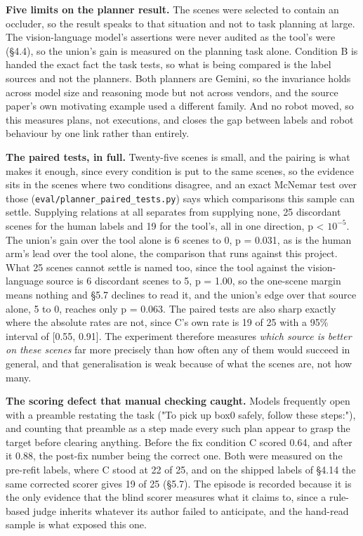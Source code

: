 \textbf{Five limits on the planner result.} The scenes were selected to contain an occluder, so the result speaks to that situation and not to task planning at large. The vision-language model's assertions were never audited as the tool's were (\S{}4.4), so the union's gain is measured on the planning task alone. Condition B is handed the exact fact the task tests, so what is being compared is the label sources and not the planners. Both planners are Gemini, so the invariance holds across model size and reasoning mode but not across vendors, and the source paper's own motivating example used a different family. And no robot moved, so this measures plans, not executions, and closes the gap between labels and robot behaviour by one link rather than entirely.

\textbf{The paired tests, in full.} Twenty-five scenes is small, and the pairing is what makes it enough, since every condition is put to the same scenes, so the evidence sits in the scenes where two conditions disagree, and an exact McNemar test over those (\texttt{eval/planner\_\allowbreak{}paired\_\allowbreak{}tests.py}) says which comparisons this sample can settle. Supplying relations at all separates from supplying none, 25 discordant scenes for the human labels and 19 for the tool's, all in one direction, p < $10^{-5}$. The union's gain over the tool alone is 6 scenes to 0, p = 0.031, as is the human arm's lead over the tool alone, the comparison that runs against this project. What 25 scenes cannot settle is named too, since the tool against the vision-language source is 6 discordant scenes to 5, p = 1.00, so the one-scene margin means nothing and \S{}5.7 declines to read it, and the union's edge over that source alone, 5 to 0, reaches only p = 0.063. The paired tests are also sharp exactly where the absolute rates are not, since C's own rate is 19 of 25 with a 95\% interval of [0.55, 0.91]. The experiment therefore measures \textit{which source is better on these scenes} far more precisely than how often any of them would succeed in general, and that generalisation is weak because of what the scenes are, not how many.

\textbf{The scoring defect that manual checking caught.} Models frequently open with a preamble restating the task ("To pick up box0 safely, follow these steps:"), and counting that preamble as a step made every such plan appear to grasp the target before clearing anything. Before the fix condition C scored 0.64, and after it 0.88, the post-fix number being the correct one. Both were measured on the pre-refit labels, where C stood at 22 of 25, and on the shipped labels of \S{}4.14 the same corrected scorer gives 19 of 25 (\S{}5.7). The episode is recorded because it is the only evidence that the blind scorer measures what it claims to, since a rule-based judge inherits whatever its author failed to anticipate, and the hand-read sample is what exposed this one.


